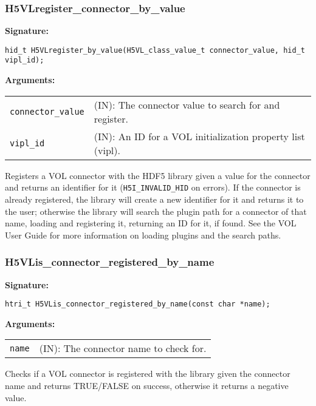 \subsubsection{H5VLregister\_connector\_by\_value}
\begin{mdframed}[style=bgbox]
\textbf{Signature:}
\begin{lstlisting}
hid_t H5VLregister_by_value(H5VL_class_value_t connector_value, hid_t vipl_id);
\end{lstlisting}
\textbf{Arguments:}\\
\begin{tabular}{l p{13.5cm}}
  {\tt connector\_value} & (IN): The connector value to search for and register.\\
  {\tt vipl\_id} & (IN): An ID for a VOL initialization property list (vipl).\\
\end{tabular}
\end{mdframed}
Registers a VOL connector with the HDF5 library given a value for the connector and returns an identifier for it (\texttt{H5I\_INVALID\_HID} on errors). If the connector is already registered, the library will create a new identifier for it and returns it to the user; otherwise the library will search the plugin path for a connector of that name, loading and registering it, returning an ID for it, if found. See the VOL User Guide for more information on loading plugins and the search paths.
\bigskip


\subsubsection{H5VLis\_connector\_registered\_by\_name}
\begin{mdframed}[style=bgbox]
\textbf{Signature:}
\begin{lstlisting}
htri_t H5VLis_connector_registered_by_name(const char *name);
\end{lstlisting}
\textbf{Arguments:}\\
\begin{tabular}{l p{13.5cm}}
  {\tt name} & (IN): The connector name to check for.\\
\end{tabular}
\end{mdframed}
Checks if a VOL connector is registered with the library given the connector name and returns TRUE/FALSE on success, otherwise it returns a negative value.
\bigskip


